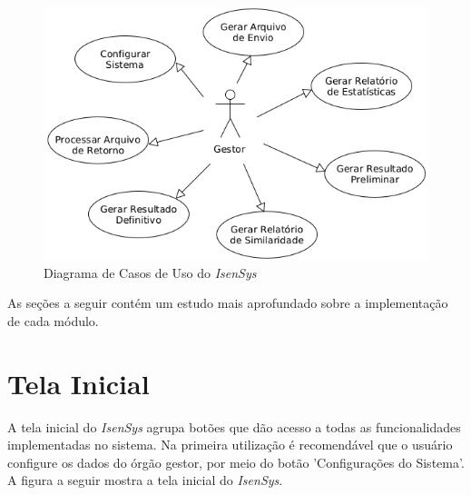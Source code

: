 \documentclass[
	12pt,			%
	openright,		%
	oneside,	
	a4paper,		%
	english,		%
	brazil			%
]{abntex2/abntex2}  %
\begin{document}
		\clearpage
		\begin{figure}[!ht]
			\begin{center}
				
				\caption{Diagrama de Casos de Uso do \textit{IsenSys}}
				\includegraphics[scale=0.5]{img/casos-uso-isensys}
				
			\end{center}
		\end{figure}
		
		As seções a seguir contém um estudo mais aprofundado sobre a implementação de cada módulo.

		\section{Tela Inicial}
		
			A tela inicial do \textit{IsenSys} agrupa botões que dão acesso a todas as funcionalidades implementadas no sistema. Na primeira utilização é recomendável que o usuário configure os dados do órgão gestor, por meio do botão 'Configurações do Sistema'. A figura a seguir mostra a tela inicial do \textit{IsenSys}.
			
\end{document}
